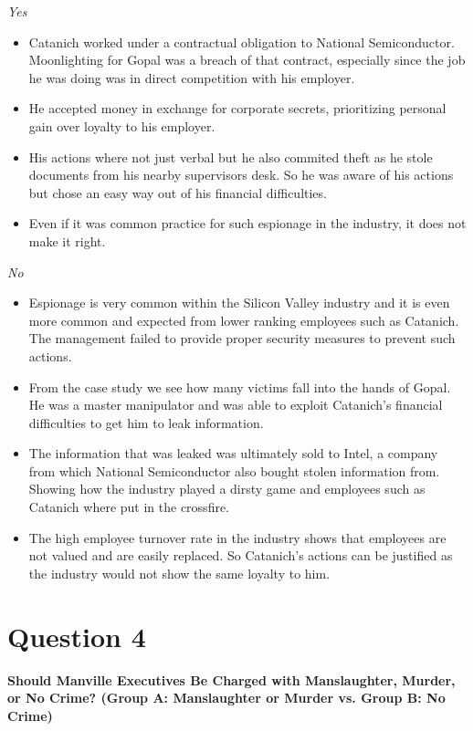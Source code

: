 \documentclass{article}
\begin{document}
\textit{Yes}
\begin{itemize}
    \item Catanich worked under a contractual obligation to National Semiconductor. Moonlighting for Gopal was a breach of that contract, especially since the job he was doing was in direct competition with his employer.
    \item He accepted money in exchange for corporate secrets, prioritizing personal gain over loyalty to his employer.
    \item His actions where not just verbal but he also commited theft as he stole documents from his nearby supervisors desk. So he was aware of his actions but chose an easy way out of his financial difficulties.
    \item Even if it was common practice for such espionage in the industry, it does not make it right.
\end{itemize}

\textit{No}
\begin{itemize}
    \item Espionage is very common within the Silicon Valley industry and it is even more common and expected from lower ranking employees such as Catanich. The management failed to provide proper security measures to prevent such actions.
    \item From the case study we see how many victims fall into the hands of Gopal. He was a master manipulator and was able to exploit Catanich's financial difficulties to get him to leak information.
    \item The information that was leaked was ultimately sold to Intel, a company from which National Semiconductor also bought stolen information from. Showing how the industry played a dirsty game and employees such as Catanich where put in the crossfire.
    \item The high employee turnover rate in the industry shows that employees are not valued and are easily replaced. So Catanich's actions can be justified as the industry would not show the same loyalty to him.
\end{itemize}

\section*{Question 4}
\textbf{Should Manville Executives Be Charged with Manslaughter, Murder, or No Crime? (Group A: Manslaughter or Murder vs. Group B: No Crime)}
\end{document}
